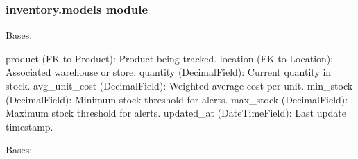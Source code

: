 \documentclass[a4paper,11pt,spanish]{sphinxmanual}
\begin{document}
\sphinxstepscope


\subsubsection{inventory.models module}
\label{\detokenize{api/inventory/inventory.models:module-inventory.models}}\label{\detokenize{api/inventory/inventory.models:inventory-models-module}}\label{\detokenize{api/inventory/inventory.models::doc}}

\begin{fulllineitems}
\label{\detokenize{api/inventory/inventory.models:inventory.models.Inventory}}
\pysigstartsignatures
\pysiglinewithargsret
{}
{\sphinxparamcomma {}}
{}
\pysigstopsignatures
\sphinxAtStartPar
Bases: 
\begin{description}
\sphinxAtStartPar
product (FK to Product): Product being tracked.
location (FK to Location): Associated warehouse or store.
quantity (DecimalField): Current quantity in stock.
avg\_unit\_cost (DecimalField): Weighted average cost per unit.
min\_stock (DecimalField): Minimum stock threshold for alerts.
max\_stock (DecimalField): Maximum stock threshold for alerts.
updated\_at (DateTimeField): Last update timestamp.

\end{description}

\begin{fulllineitems}
\label{\detokenize{api/inventory/inventory.models:inventory.models.Inventory.DoesNotExist}}
\pysigstartsignatures
\pysigline
{}
\pysigstopsignatures
\sphinxAtStartPar
Bases: 

\end{fulllineitems}



\end{fulllineitems}
\end{document}
